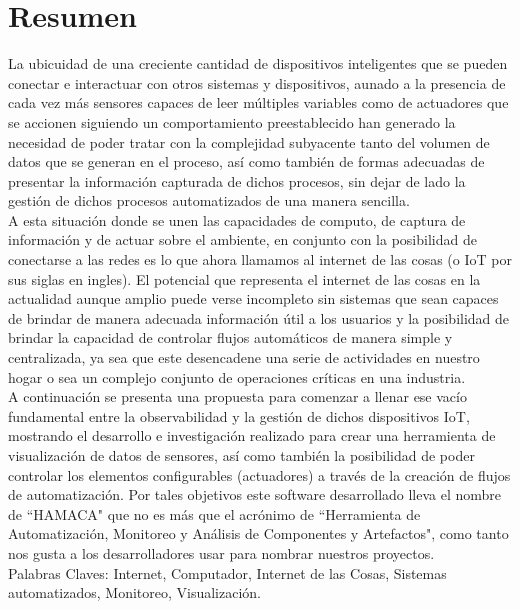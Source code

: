 \chapter*{Resumen}
La ubicuidad de una creciente cantidad de dispositivos inteligentes que se pueden conectar e interactuar con otros sistemas y dispositivos, aunado a la presencia de cada vez más sensores capaces de leer múltiples variables como de actuadores que se accionen siguiendo un comportamiento preestablecido han generado la necesidad de poder tratar con la complejidad subyacente tanto del volumen de datos que se generan en el proceso, así como también de formas adecuadas de presentar la información capturada de dichos procesos, sin dejar de lado la gestión de dichos procesos automatizados de una manera sencilla.\\

A esta situación donde se unen las capacidades de computo, de captura de información y de actuar sobre el ambiente, en conjunto con la posibilidad de conectarse a las redes es lo que ahora llamamos al internet de las cosas (o IoT por sus siglas en ingles). El potencial que representa el internet de las cosas en la actualidad aunque amplio puede verse incompleto sin sistemas que sean capaces de brindar de manera adecuada información útil a los usuarios y la posibilidad de brindar la capacidad de controlar flujos automáticos de manera simple y centralizada, ya sea que este desencadene una serie de actividades en nuestro hogar o sea un complejo conjunto de operaciones críticas en una industria.\\ 

A continuación se presenta una propuesta para comenzar a llenar ese vacío fundamental entre la observabilidad y la gestión de dichos dispositivos IoT, mostrando el desarrollo e investigación realizado para crear una herramienta de visualización de datos de sensores, así como también la posibilidad de poder controlar los elementos configurables (actuadores) a través de la creación de flujos de automatización. Por tales objetivos este software desarrollado lleva el nombre de ``HAMACA" que no es más que el acrónimo de ``Herramienta de Automatización, Monitoreo y Análisis de Componentes y Artefactos", como tanto nos gusta a los desarrolladores usar para nombrar nuestros proyectos.\\
 
\vspace{\fill}
Palabras Claves: Internet, Computador, Internet de las Cosas, Sistemas automatizados, Monitoreo, Visualización.
\vspace{10px}